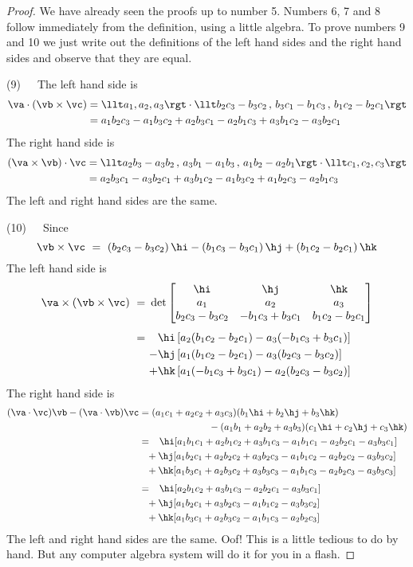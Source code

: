 \begin{proof}
We have already seen the proofs up to number 5. Numbers 6, 7 and 8 
follow immediately from the definition, using a little algebra. To prove 
numbers 9 and 10 we just write out the definitions of the left hand sides 
and the right hand sides and observe that they are equal.

\medskip
\noindent (9)\ \ \ The left hand side is
\begin{align*}
\va\cdot(\vb\times\vc)
&=\llt a_1,a_2,a_3\rgt\cdot
      \llt b_2c_3-b_3c_2\,,\, b_3c_1-b_1c_3\,,\, b_1c_2-b_2c_1\rgt\\
&=a_1b_2c_3 - a_1b_3c_2 + a_2b_3c_1 - a_2b_1c_3 + a_3b_1c_2 - a_3b_2c_1
\end{align*}
The right hand side is
\begin{align*}
(\va\times\vb)\cdot\vc
&=\llt a_2b_3-a_3b_2\,,\, a_3b_1-a_1b_3\,,\, a_1b_2-a_2b_1\rgt\cdot
       \llt c_1,c_2,c_3\rgt \\
&=a_2b_3c_1 - a_3b_2c_1 + a_3b_1c_2 - a_1b_3c_2 + a_1b_2c_3 - a_2b_1c_3
\end{align*}
The left and right hand sides are the same.

\medskip
\noindent (10)\ \ \ Since
$$
\vb\times\vc
\ =\ (b_2c_3-b_3c_2)\,\hi-(b_1c_3-b_3c_1)\,\hj
    +(b_1c_2-b_2c_1)\,\hk
$$
The left hand side is
\begin{align*}
\va\times(\vb\times\vc)
\ =\ &\det\left[\begin{matrix} \hi & \hj & \hk \\
                     a_1&a_2&a_3\\
                 b_2c_3-b_3c_2&-b_1c_3+b_3c_1&b_1c_2-b_2c_1
             \end{matrix}\right]\\[0.05in]
\ =\ &\phantom{-}\hi\,[a_2(b_1c_2-b_2c_1)-a_3(-b_1c_3+b_3c_1)]\\
     & {-}\hj\,[a_1(b_1c_2-b_2c_1)-a_3(b_2c_3-b_3c_2)]\\
     & {+}\hk\,[a_1(-b_1c_3+b_3c_1)-a_2(b_2c_3-b_3c_2)]
\end{align*}
The right hand side is
\begin{align*}
(\va\cdot\vc)\vb-(\va\cdot\vb)\vc
&=(a_1c_1+a_2c_2+a_3c_3)(b_1\hi+b_2\hj+b_3\hk) \\
     &\hskip1in -(a_1b_1+a_2b_2+a_3b_3)(c_1\hi+c_2\hj+c_3\hk)\\
&=\phantom{-}
\hi[a_1b_1c_1+a_2b_1c_2+a_3b_1c_3-a_1b_1c_1-a_2b_2c_1-a_3b_3c_1] \\
&\phantom{=}+\hj[a_1b_2c_1+a_2b_2c_2+a_3b_2c_3-a_1b_1c_2-a_2b_2c_2-a_3b_3c_2] \\
&\phantom{=}+\hk[a_1b_3c_1+a_2b_3c_2+a_3b_3c_3-a_1b_1c_3-a_2b_2c_3-a_3b_3c_3]
\\[0.05in]
&=\phantom{-} \hi[a_2b_1c_2+a_3b_1c_3-a_2b_2c_1-a_3b_3c_1] \\
 &\phantom{=} +\hj[a_1b_2c_1+a_3b_2c_3-a_1b_1c_2-a_3b_3c_2]\\
 &\phantom{=} +\hk[a_1b_3c_1+a_2b_3c_2-a_1b_1c_3-a_2b_2c_3]
\end{align*}
The left and right hand sides are the same. Oof! This is a little tedious
to do by hand. But any computer algebra system will do it for you in a 
flash.
\end{proof}


